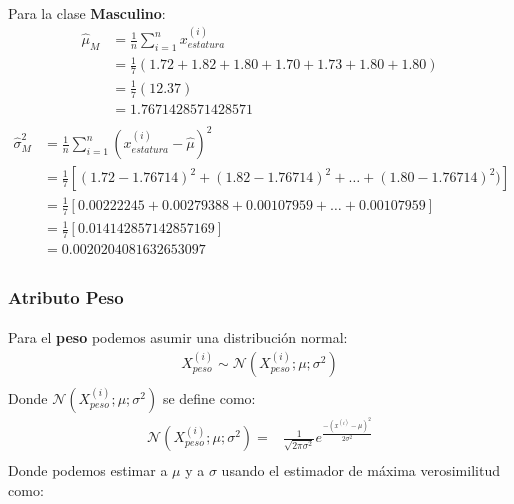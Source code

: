 \documentclass[12pt]{article}
\begin{document}
  \paragraph{} Para la clase \textbf{Masculino}:
  \begin{equation}
  \begin{split}
  \hat{\mu}_{M}&=\frac{1}{n}\sum_{i=1}^{n}{x_{estatura}^{(i)}}\\
  &=\frac{1}{7}(1.72 + 1.82 + 1.80 + 1.70 + 1.73 + 1.80 + 1.80)\\
  &=\frac{1}{7}(12.37)\\
  &= 1.7671428571428571\\
  \end{split}
  \end{equation}
  \begin{equation}
  \begin{split}
  \hat{\sigma}^2_M&=\frac{1}{n}\sum_{i=1}^{n}{(x_{estatura}^{(i)} - \hat{\mu})^2}\\
  &=\frac{1}{7}[(1.72-1.76714)^2 + (1.82-1.76714)^2  + \dots + (1.80-1.76714)^2)]\\
  &=\frac{1}{7}[0.00222245 + 0.00279388 + 0.00107959 + \dots + 0.00107959]\\
  &=\frac{1}{7}[0.014142857142857169]\\
  &= 0.0020204081632653097\\
  \end{split}
  \end{equation}
  \subsubsection{Atributo Peso}
  \paragraph{}Para el \textbf{peso} podemos asumir una distribución normal:
  \begin{equation}
  \begin{split}
  X_{peso}^{(i)}\sim \mathcal{N}(X_{peso}^{(i)};\mu;\sigma^2)\\
  \end{split}
  \end{equation}
  Donde $\mathcal{N}(X_{peso}^{(i)};\mu;\sigma^2)$ se define como:\\
  \begin{equation}
  \begin{split}
  \mathcal{N}(X_{peso}^{(i)};\mu;\sigma^2) =& \frac{1}{\sqrt{2\pi\sigma^2}}e^{\frac{-(x^{(i)} - \mu)^2}{2\sigma^2}}\\
  \end{split}
  \end{equation}
  Donde podemos estimar a $\mu$ y a $\sigma$ usando el estimador de máxima verosimilitud como:
\end{document}
